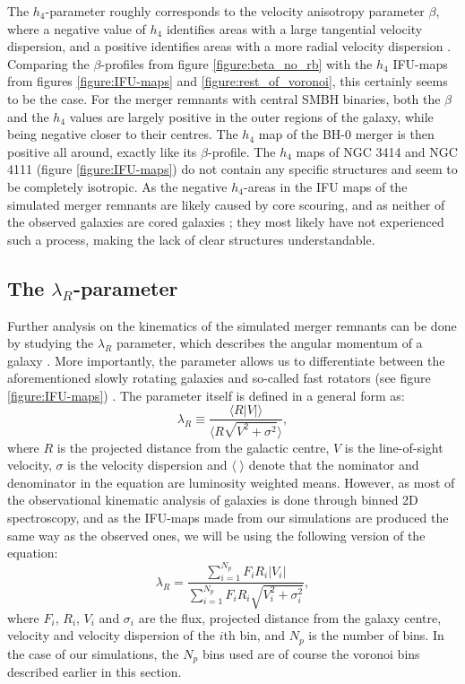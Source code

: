 \documentclass[english, oneside]{HYgradu}
\begin{document}
The $h_4$-parameter roughly corresponds to the velocity anisotropy parameter $\beta$, where a negative value of $h_4$ identifies areas with a large tangential velocity dispersion, and a positive identifies areas with a more radial velocity dispersion \citep{Gerhard1993, Gerhard1998, Thomas2007}. Comparing the $\beta$-profiles from figure \ref{figure:beta_no_rb} with the $h_4$ IFU-maps from figures \ref{figure:IFU-maps} and \ref{figure:rest_of_voronoi}, this certainly seems to be the case. For the merger remnants with central SMBH binaries, both the $\beta$ and the $h_4$ values are largely positive in the outer regions of the galaxy, while being negative closer to their centres. The $h_4$ map of the BH-0 merger is then positive all around, exactly like its $\beta$-profile. The $h_4$ maps of NGC 3414 and NGC 4111 (figure \ref{figure:IFU-maps}) do not contain any specific structures and seem to be completely isotropic. As the negative $h_4$-areas in the IFU maps of the simulated merger remnants are likely caused by core scouring, and as neither of the observed galaxies are cored galaxies \citep{Lauer2007}; they most likely have not experienced such a process, making the lack of clear structures understandable.

\subsection{The $\lambda_R$-parameter}

Further analysis on the kinematics of the simulated merger remnants can be done by studying the $\lambda_R$ parameter, which describes the angular momentum of a galaxy \citep{Emsellem2007}. More importantly, the parameter allows us to differentiate between the aforementioned slowly rotating galaxies and so-called fast rotators (see figure \ref{figure:IFU-maps}) \citep{Emsellem2007}. The parameter itself is defined in a general form as:
\begin{equation}
\lambda_R \equiv \frac{\langle R |V| \rangle}{\langle R \sqrt{V^2 + \sigma^2} \rangle}, \label{eq:general_lambdar}
\end{equation}
where $R$ is the projected distance from the galactic centre, $V$ is the line-of-sight velocity, $\sigma$ is the velocity dispersion and $\langle \; \rangle$ denote that the nominator and denominator in the equation are luminosity weighted means. However, as most of the observational kinematic analysis of galaxies is done through binned 2D spectroscopy, and as the IFU-maps made from our simulations are produced the same way as the observed ones, we will be using the following version of the equation:
\begin{equation}
\lambda_R = \frac{\sum^{N_p}_{i=1} F_i R_i |V_i|}{\sum^{N_p}_{i=1} F_i R_i \sqrt{V_i^2 + \sigma^2_i}}, \label{eq:binned_lambdar}
\end{equation}
where $F_i$, $R_i$, $V_i$ and $\sigma_i$ are the flux, projected distance from the galaxy centre, velocity and velocity dispersion of the $i$th bin, and $N_p$ is the number of bins. In the case of our simulations, the $N_p$ bins used are of course the voronoi bins described earlier in this section. 
\end{document}

